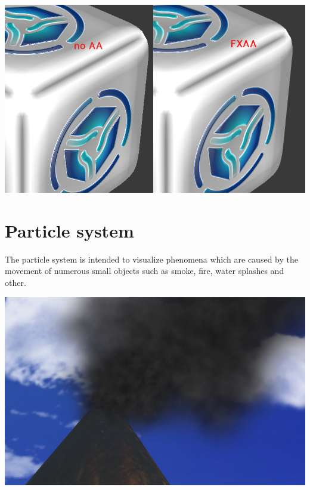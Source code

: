 \documentclass[a4paper,12pt,oneside]{sphinxmanual}
\begin{document}
{\hfill\includegraphics[width=1.000\linewidth]{antialiasing.jpg}\hfill}

\begin{DUlineblock}{0em}
\item[] 
\end{DUlineblock}
\label{particles:particles}

\chapter{Particle system}
\label{particles:index-0}\label{particles::doc}\label{particles:id1}
The particle system is intended to visualize phenomena which are caused by the movement of numerous small objects such as smoke, fire, water splashes and other.

{\hfill\includegraphics[width=1.000\linewidth]{particles_smoke.jpg}\hfill}

\begin{DUlineblock}{0em}
\item[] 
\end{DUlineblock}
\end{document}
